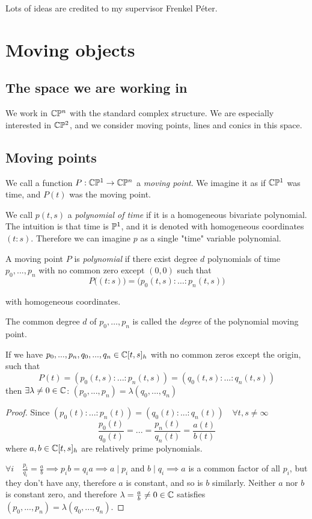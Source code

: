 \documentclass[a4paper]{article}
\begin{document}
Lots of ideas are credited to my supervisor Frenkel Péter.



\section{Moving objects}

\subsection{The space we are working in}

We work in $\mathbb{C}\mathbb{P}^n$ with the standard complex structure. We are especially interested in $\mathbb{C}\mathbb{P}^2$, and we consider moving points, lines and conics in this space.

\subsection{Moving points}

We call a function $P: \mathbb{C}\mathbb{P}^1 \to \mathbb{C}\mathbb{P}^n$ a \textit{moving point}. We imagine it as if $\mathbb{C}\mathbb{P}^1$ was time, and $P(t)$ was the moving point.

We call $p(t,s)$ a \textit{polynomial of time} if it is a homogeneous bivariate polynomial. The intuition is that time is $\mathbb{P}^1$, and it is denoted with homogeneous coordinates $(t:s)$. Therefore we can imagine $p$ as a single "time" variable polynomial.

A moving point $P$ is \textit{polynomial} if there exist degree $d$ polynomials of time $p_0,...,p_n$ with no common zero except $(0,0)$ such that $$P\bigl((t:s)\bigr)=\bigl(p_0(t,s):\ldots:p_n(t,s)\bigr)$$

with homogeneous coordinates.

The common degree $d$ of $p_0,\ldots,p_n$ is called the \textit{degree} of the polynomial moving point.

\begin{lemma}
\hfill\break
    If we have $p_0,...,p_n, q_0,...,q_n \in \mathbb{C}[t,s]_h$ with no common zeros except the origin, such that
    $$P(t)=(p_0(t,s):...:p_n(t,s))=(q_0(t,s):...:q_n(t,s))$$
    then $\exists \lambda \ne 0 \in \mathbb{C}$: $ (p_0,...,p_n)=\lambda(q_0,...,q_n) $
\end{lemma}

\begin{proof}
    Since $(p_0(t):...:p_n(t))=(q_0(t):...:q_n(t)) \quad \forall t,s\ne\infty$
    $$\frac{p_0(t)}{q_0(t)}=...=\frac{p_n(t)}{q_n(t)}=\frac{a(t)}{b(t)}$$
    where $a,b\in \mathbb{C}[t,s]_h$ are relatively prime polynomials.

    $\forall i \quad \frac{p_i}{q_i}=\frac{a}{b} \implies p_ib=q_ia \implies a\mid p_i$ and $b\mid q_i \implies a$ is a common factor of all $p_i$, but they don't have any, therefore $a$ is constant, and so is $b$ similarly. Neither $a$ nor $b$ is constant zero, and therefore $\lambda=\frac{a}{b}\ne 0\in \mathbb{C}$ satisfies $(p_0,...,p_n)=\lambda(q_0,...,q_n)$.
\end{proof}
\end{document}
